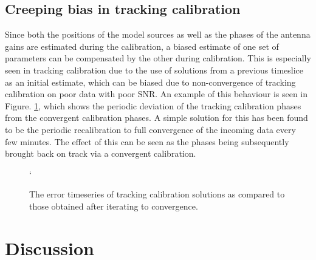\documentclass{aa}
\begin{document}
\subsection{Creeping bias in tracking calibration}

Since both the positions of the model sources as well as the phases
of the antenna gains are estimated during the calibration, a biased
estimate of one set of parameters can be compensated by the other
during calibration. This is especially seen in tracking calibration
due to the use of solutions from a previous timeslice as an initial
estimate, which can be biased due to non-convergence of tracking calibration
on poor data with poor SNR. An example of this behaviour is seen in
Figure. \ref{fig:The-error-timeseries-1}, which shows the periodic
deviation of the tracking calibration phases from the convergent calibration
phases. A simple solution for this has been found to be the periodic
recalibration to full convergence of the incoming data every few minutes.
The effect of this can be seen as the phases being subsequently brought
back on track via a convergent calibration.

\begin{figure}[tbh]
`\caption{\label{fig:The-error-timeseries-1}The error timeseries of tracking
calibration solutions as compared to those obtained after iterating
to convergence. }
\end{figure}





\section{\label{sec:Discussion}Discussion}
\end{document}
